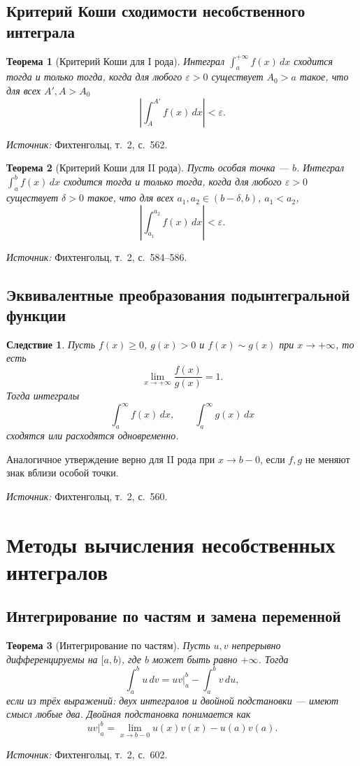 \documentclass[12pt,a4paper]{article}
\newcommand{\eps}{\varepsilon}
\newcommand{\source}[1]{\par\noindent\textit{Источник:} #1.}
\theoremstyle{definition}
\theoremstyle{plain}
\newtheorem{theorem}{Теорема}[section]
\newtheorem{corollary}{Следствие}[section]
\theoremstyle{remark}
\begin{document}
\subsection{Критерий Коши сходимости несобственного интеграла}

\begin{theorem}[Критерий Коши для I рода]
Интеграл \(\int_a^{+\infty}f(x)\,dx\) сходится тогда и только тогда, когда для любого \(\eps>0\) существует \(A_0>a\) такое, что для всех \(A',A>A_0\)
\[
\left|\int_A^{A'}f(x)\,dx\right|<\eps.
\]
\end{theorem}
\source{Фихтенгольц, т.~2, с.~562}

\begin{theorem}[Критерий Коши для II рода]
Пусть особая точка — \(b\). Интеграл \(\int_a^b f(x)\,dx\) сходится тогда и только тогда, когда для любого \(\eps>0\) существует \(\delta>0\) такое, что для всех \(a_1,a_2\in(b-\delta,b)\), \(a_1<a_2\),
\[
\left|\int_{a_1}^{a_2}f(x)\,dx\right|<\eps.
\]
\end{theorem}
\source{Фихтенгольц, т.~2, с.~584--586}

\subsection{Эквивалентные преобразования подынтегральной функции}

\begin{corollary}
Пусть \(f(x)\ge0\), \(g(x)>0\) и \(f(x)\sim g(x)\) при \(x\to+\infty\), то есть
\[
\lim_{x\to+\infty}\frac{f(x)}{g(x)}=1.
\]
Тогда интегралы
\[
\int_a^\infty f(x)\,dx,\qquad \int_a^\infty g(x)\,dx
\]
сходятся или расходятся одновременно.
\end{corollary}

Аналогичное утверждение верно для II рода при \(x\to b-0\), если \(f,g\) не меняют знак вблизи особой точки.
\source{Фихтенгольц, т.~2, с.~560}

\section{Методы вычисления несобственных интегралов}

\subsection{Интегрирование по частям и замена переменной}

\begin{theorem}[Интегрирование по частям]
Пусть \(u,v\) непрерывно дифференцируемы на \([a,b)\), где \(b\) может быть равно \(+\infty\). Тогда
\[
\int_a^b u\,dv
=
uv\big|_a^b-\int_a^b v\,du,
\]
если из трёх выражений: двух интегралов и двойной подстановки — имеют смысл любые два. Двойная подстановка понимается как
\[
uv\big|_a^b=\lim_{x\to b-0}u(x)v(x)-u(a)v(a).
\]
\end{theorem}
\source{Фихтенгольц, т.~2, с.~602}
\end{document}
